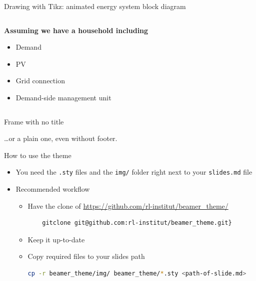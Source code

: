 \documentclass[ignorenonframetext,aspectratio=169]{beamer}
\begin{document}
\begin{frame}{Drawing with Tikz: animated energy system block diagram}
\begin{columns}[T]
\begin{column}{0.4\textwidth}
\textbf{Assuming we have a household including}

\begin{itemize}
\item<2-> Demand
\item<3-> PV
\item<4-> Grid connection
\item<5-> Demand-side management unit
\end{itemize}
\end{column}
\end{columns}

\end{frame}

\begin{frame}

Frame with no title

\end{frame}

\begin{frame}[plain]{}

\ldots or a plain one, even without footer.

\end{frame}

\begin{frame}[fragile]{How to use the theme}

\begin{itemize}
\item
  You need the \texttt{.sty} files and the \texttt{img/} folder right
  next to your \texttt{slides.md} file
\item
  Recommended workflow

  \begin{itemize}
  \item Have the clone of \url{https://github.com/rl-institut/beamer_theme/}
    \begin{lstlisting}
    gitclone git@github.com:rl-institut/beamer_theme.git}
  \end{lstlisting}
  \item Keep it up-to-date
  \item Copy required files to your slides path
    \begin{lstlisting}[language=Bash]
    cp -r beamer_theme/img/ beamer_theme/*.sty <path-of-slide.md> 
    \end{lstlisting}
  \end{itemize}
\end{itemize}

\end{frame}
\end{document}
